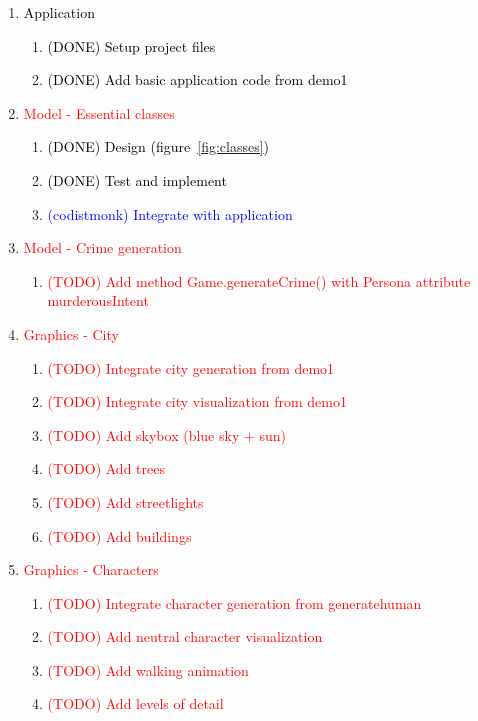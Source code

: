 \documentclass[a4paper, twoside]{article}
\begin{document}
\begin{enumerate}
	\item{} \textcolor{black}{Application} \begin{enumerate}
		\item{} \textcolor{black}{(DONE) Setup project files}
		\item{} \textcolor{black}{(DONE) Add basic application code from demo1}
	\end{enumerate}
	\item{} \textcolor{red}{Model - Essential classes} \begin{enumerate}
		\item{} \textcolor{black}{(DONE) Design (figure~\ref{fig:classes})}
		\item{} \textcolor{black}{(DONE) Test and implement}
		\item{} \textcolor{blue}{(codistmonk) Integrate with application}
	\end{enumerate}
	\item{} \textcolor{red}{Model - Crime generation} \begin{enumerate}
		\item{} \textcolor{red}{(TODO) Add method Game.generateCrime() with Persona attribute murderousIntent}
	\end{enumerate}
	\item{} \textcolor{red}{Graphics - City} \begin{enumerate}
		\item{} \textcolor{red}{(TODO) Integrate city generation from demo1}
		\item{} \textcolor{red}{(TODO) Integrate city visualization from demo1}
		\item{} \textcolor{red}{(TODO) Add skybox (blue sky + sun)}
		\item{} \textcolor{red}{(TODO) Add trees}
		\item{} \textcolor{red}{(TODO) Add streetlights}
		\item{} \textcolor{red}{(TODO) Add buildings}
	\end{enumerate}
	\item{} \textcolor{red}{Graphics - Characters} \begin{enumerate}
		\item{} \textcolor{red}{(TODO) Integrate character generation from generatehuman}
		\item{} \textcolor{red}{(TODO) Add neutral character visualization}
		\item{} \textcolor{red}{(TODO) Add walking animation}
		\item{} \textcolor{red}{(TODO) Add levels of detail}

\end{enumerate}
\end{enumerate}
\end{document}
